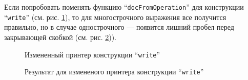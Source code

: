 Если попробовать поменять функцию “\lstinline[language=Haskell]{docFromOperation}” для конструкции “\lstinline[language=llang]{write}” (см. рис. \ref{fig:lHughesWriteChange}),
то для многострочного выражения все получится правильно, но в случае однострочного --- появится лишний пробел перед закрывающей скобкой (см. рис. \ref{fig:lBadWriteEx})).

\begin{figure}[h!]
	
	\caption{Измененный принтер конструкции “\lstinline[language=llang]{write}”}
	\label{fig:lHughesWriteChange}
\end{figure}

\begin{figure}[h!]
	
	\caption{Результат для измененого принтера конструкции “\lstinline[language=llang]{write}”}
	\label{fig:lBadWriteEx}
\end{figure}